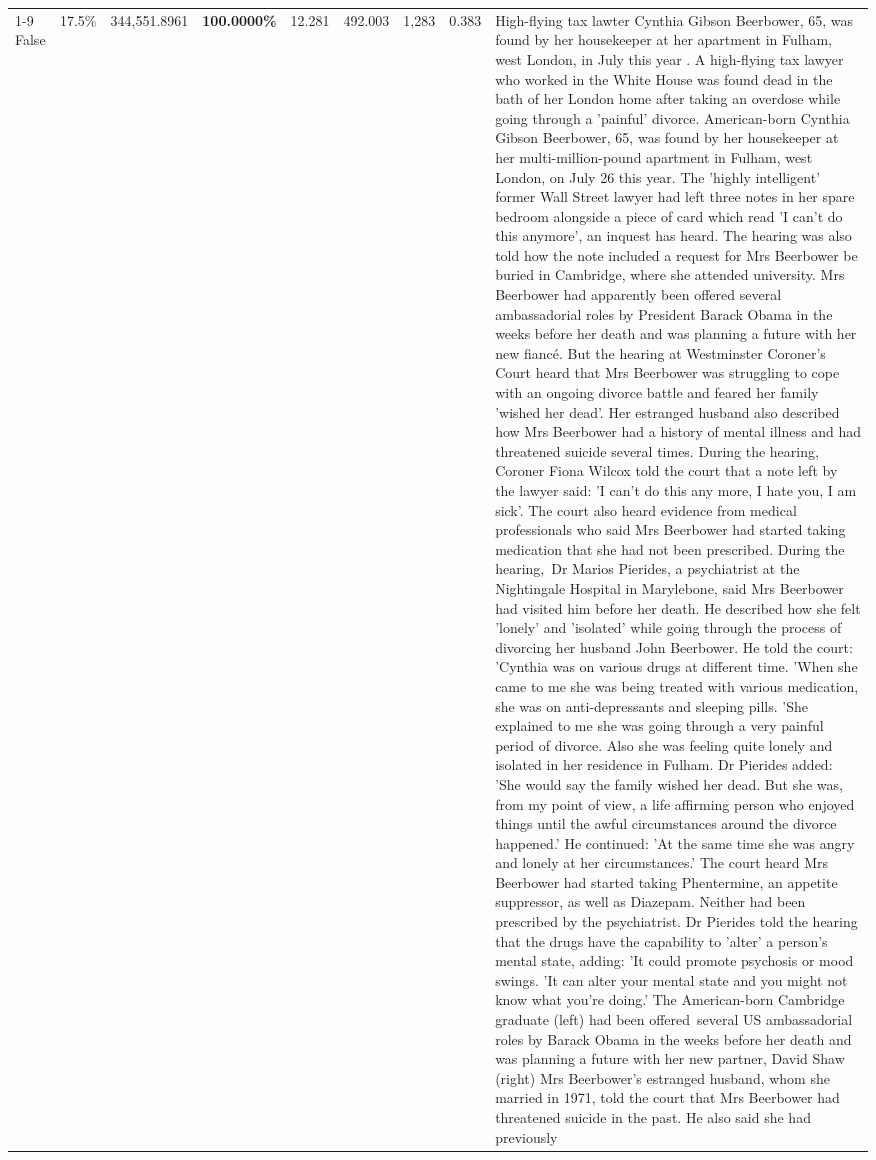\begin{table}[H]
\begin{tabular}{lllrlllll}
\cline{1-9}
False & 17.5\% & 344,551.8961 & \bfseries \color{red} 100.0000\% & 12.281 & 492.003 & 1,283 & 0.383 & High-flying tax lawter Cynthia Gibson Beerbower, 65, was found by her housekeeper at her apartment in Fulham, west London, in July this year . A high-flying tax lawyer who worked in the White House was found dead in the bath of her London home after taking an overdose while going through a 'painful' divorce. American-born Cynthia Gibson Beerbower, 65, was found by her housekeeper at her multi-million-pound apartment in Fulham, west London, on July 26 this year. The 'highly intelligent' former Wall Street lawyer had left three notes in her spare bedroom alongside a piece of card which read 'I can't do this anymore', an inquest has heard. The hearing was also told how the note included a request for Mrs Beerbower be buried in Cambridge, where she attended university. Mrs Beerbower had apparently been offered several ambassadorial roles by President Barack Obama in the weeks before her death and was planning a future with her new fiancé. But the hearing at Westminster Coroner's Court heard that Mrs Beerbower was struggling to cope with an ongoing divorce battle and feared her family 'wished her dead'. Her estranged husband also described how Mrs Beerbower had a history of mental illness and had threatened suicide several times. During the hearing, Coroner Fiona Wilcox told the court that a note left by the lawyer said: 'I can't do this any more, I hate you, I am sick'. The court also heard evidence from medical professionals who said Mrs Beerbower had started taking medication that she had not been prescribed. During the hearing, Dr Marios Pierides, a psychiatrist at the Nightingale Hospital in Marylebone, said Mrs Beerbower had visited him before her death. He described how she felt 'lonely' and 'isolated' while going through the process of divorcing her husband John Beerbower. He told the court: 'Cynthia was on various drugs at different time. 'When she came to me she was being treated with various medication, she was on anti-depressants and sleeping pills. 'She explained to me she was going through a very painful period of divorce. Also she was feeling quite lonely and isolated in her residence in Fulham. Dr Pierides added: 'She would say the family wished her dead. But she was, from my point of view, a life affirming person who enjoyed things until the awful circumstances around the divorce happened.' He continued: 'At the same time she was angry and lonely at her circumstances.' The court heard Mrs Beerbower had started taking Phentermine, an appetite suppressor, as well as Diazepam. Neither had been prescribed by the psychiatrist. Dr Pierides told the hearing that the drugs have the capability to 'alter' a person's mental state, adding: 'It could promote psychosis or mood swings. 'It can alter your mental state and you might not know what you're doing.' The American-born Cambridge graduate (left) had been offered several US ambassadorial roles by Barack Obama in the weeks before her death and was planning a future with her new partner, David Shaw (right) Mrs Beerbower's estranged husband, whom she married in 1971, told the court that Mrs Beerbower had threatened suicide in the past. He also said she had previously 
\end{tabular}
\end{table}
